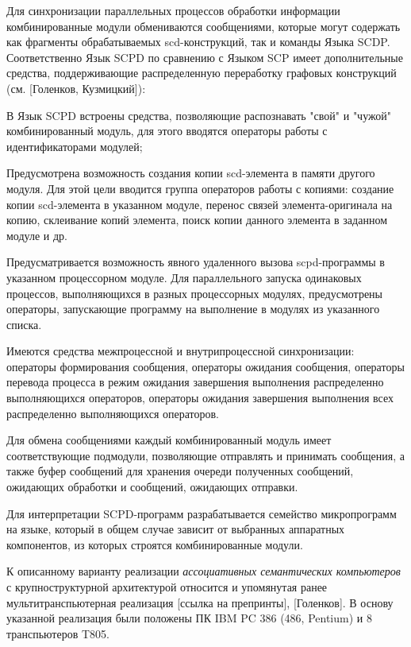 \begin{textitemize}
	\item Для синхронизации параллельных процессов обработки информации комбинированные модули обмениваются сообщениями, которые могут содержать как фрагменты обрабатываемых scd-конструкций, так и команды Языка SCDP. Соответственно Язык SCPD по сравнению с Языком SCP имеет дополнительные средства, поддерживающие распределенную переработку графовых конструкций (см. [Голенков, Кузмицкий]):
	\begin{textitemize}
		\item В Язык SCPD встроены средства, позволяющие распознавать "свой"{} и "чужой"{} комбинированный модуль, для этого вводятся операторы работы с идентификаторами модулей;
		\item Предусмотрена возможность создания копии scd-элемента в памяти другого модуля. Для этой цели вводится группа операторов работы с копиями: создание копии scd-элемента в указанном модуле, перенос связей элемента-оригинала на копию, склеивание копий элемента, поиск копии данного элемента в заданном модуле и др.
		\item Предусматривается возможность явного удаленного вызова scpd-программы в указанном процессорном модуле. Для параллельного запуска одинаковых процессов, выполняющихся в разных процессорных модулях, предусмотрены операторы, запускающие программу на выполнение в модулях из указанного списка.
		\item Имеются средства межпроцессной и внутрипроцессной синхронизации: операторы формирования сообщения, операторы ожидания сообщения, операторы перевода процесса в режим ожидания завершения выполнения распределенно выполняющихся операторов, операторы ожидания завершения выполнения всех распределенно выполняющихся операторов.
	\end{textitemize}
	\item Для обмена сообщениями каждый комбинированный модуль имеет соответствующие подмодули, позволяющие отправлять и принимать сообщения, а также буфер сообщений для хранения очереди полученных сообщений, ожидающих обработки и сообщений, ожидающих отправки.
	\item Для интерпретации SCPD-программ разрабатывается семейство микропрограмм на языке, который в общем случае зависит от выбранных аппаратных компонентов, из которых строятся комбинированные модули.
\end{textitemize}


К описанному варианту реализации \textit{ассоциативных семантических компьютеров} с крупноструктурной архитектурой относится и упомянутая ранее мультитранспьютерная реализация  [ссылка на препринты], [Голенков]. В основу указанной реализация были положены ПК IBM PC 386 (486, Pentium) и 8 транспьютеров T805.

